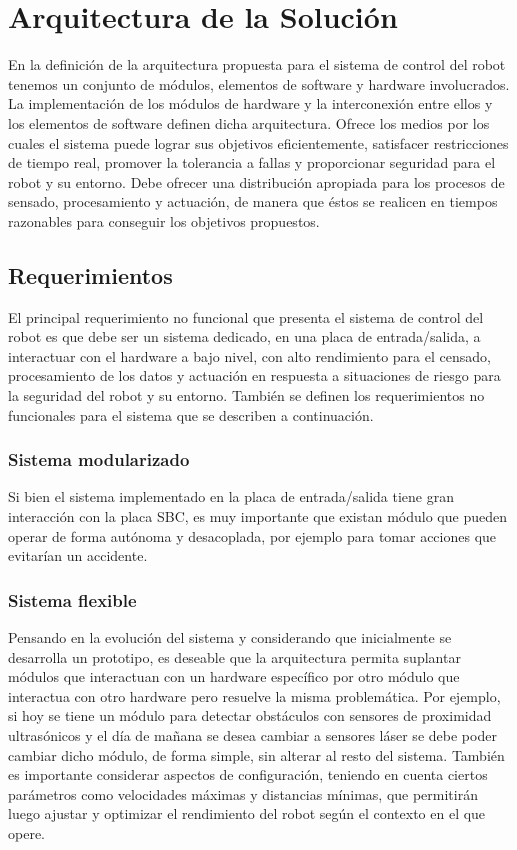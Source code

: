 \documentclass[withindex,glossary]{cam-thesis}
\begin{document}
\section{Arquitectura de la Solución}

En la definición de la arquitectura propuesta para el sistema de control del robot tenemos un conjunto de módulos, elementos de software y hardware involucrados. La implementación de los módulos de hardware y la interconexión entre ellos y los elementos de software definen dicha arquitectura.
Ofrece los medios por los cuales el sistema puede lograr sus objetivos eficientemente, satisfacer restricciones de tiempo real, promover la tolerancia a fallas y proporcionar seguridad para el robot y su entorno. Debe ofrecer una distribución apropiada para los procesos de sensado, procesamiento y actuación, de manera que éstos se realicen en tiempos razonables para conseguir los objetivos propuestos.

\subsection{Requerimientos}
El principal requerimiento no funcional que presenta el sistema de control del robot es que debe ser un sistema dedicado, en una placa de entrada/salida, a interactuar con el hardware a bajo nivel, con alto rendimiento para el censado, procesamiento de los datos y actuación en respuesta a situaciones de riesgo para la seguridad del robot y su entorno. También se definen los requerimientos no funcionales para el sistema que se describen a continuación.
\subsubsection{Sistema modularizado}
Si bien el sistema implementado en la placa de entrada/salida tiene gran interacción con la placa SBC, es muy importante que existan módulo que pueden operar de forma autónoma y desacoplada, por ejemplo para tomar acciones que evitarían un accidente.
\subsubsection{Sistema flexible}
Pensando en la evolución del sistema y considerando que inicialmente se desarrolla un prototipo, es deseable que la arquitectura permita suplantar módulos que interactuan con un hardware específico por otro módulo que interactua con otro hardware pero resuelve la misma problemática. Por ejemplo, si hoy se tiene un módulo para detectar obstáculos con sensores de proximidad ultrasónicos y el día de mañana se desea cambiar a sensores láser se debe poder cambiar dicho módulo, de forma simple, sin alterar al resto del sistema.
También es importante considerar aspectos de configuración, teniendo en cuenta ciertos parámetros como velocidades máximas y distancias mínimas, que permitirán luego ajustar y optimizar el rendimiento del robot según el contexto en el que opere.
\end{document}
